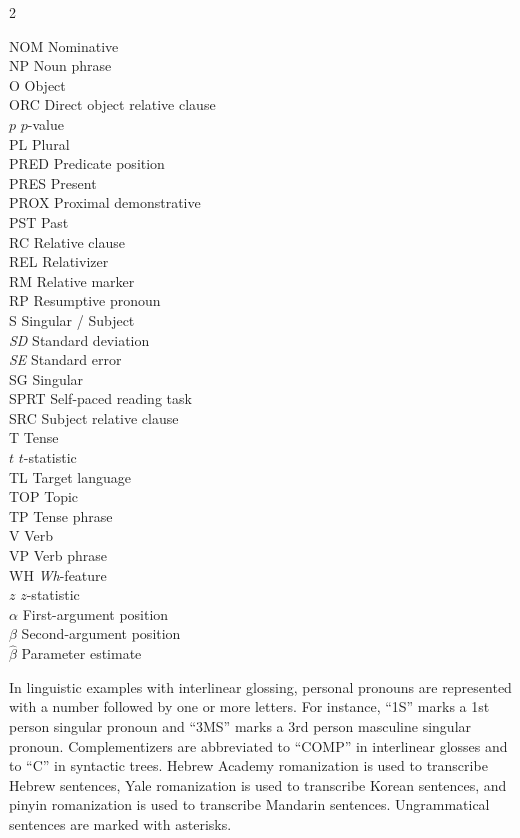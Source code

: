 \begin{multicols}{2}
\begin{tabbing}
NOM \> Nominative \\
NP \> Noun phrase \\
O \> Object \\
ORC \> Direct object relative clause \\
$p$ \> $p$-value \\
PL \> Plural \\
PRED \> Predicate position \\
PRES \> Present \\
PROX \> Proximal demonstrative \\
PST \> Past \\
RC \> Relative clause \\
REL \> Relativizer \\
RM \> Relative marker \\
RP \> Resumptive pronoun \\
S \> Singular / Subject \\
\textit{SD} \> Standard deviation \\
\textit{SE} \> Standard error \\
SG \> Singular \\
SPRT \> Self-paced reading task \\
SRC \> Subject relative clause \\
T \> Tense \\
$t$ \> $t$-statistic \\
TL \> Target language \\
TOP \> Topic \\
TP \> Tense phrase \\
V \> Verb \\
VP \> Verb phrase \\
WH \>\textit{Wh}-feature \\
$z$ \> $z$-statistic \\
$\alpha$ \> First-argument position \\
$\beta$ \> Second-argument position \\
$\hat{\beta}$ \> Parameter estimate \\
\end{tabbing}
\end{multicols}

\noindent In linguistic examples with interlinear glossing, personal pronouns are represented with a number followed by one or more letters. For instance, ``1S'' marks a 1st person singular pronoun and ``3MS'' marks a 3rd person masculine singular pronoun. Complementizers are abbreviated to ``COMP'' in interlinear glosses and to ``C'' in syntactic trees. Hebrew Academy romanization is used to transcribe Hebrew sentences, Yale romanization is used to transcribe Korean sentences, and pinyin romanization is used to transcribe Mandarin sentences. Ungrammatical sentences are marked with asterisks.